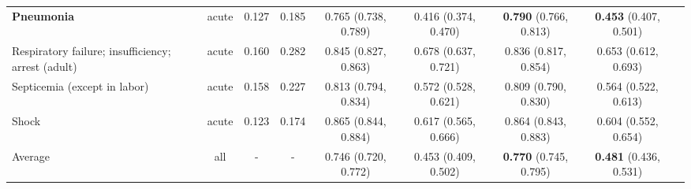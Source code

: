 \documentclass[pmlr]{jmlr}
\begin{document}
\begin{table*}[t!]
{\begin{tabular}{l c c c| c  c| c c c}
    \textbf{Pneumonia} & acute & 0.127 & 0.185 &0.765 (0.738, 0.789) & 0.416 (0.374, 0.470) & \textbf{0.790} (0.766, 0.813) & \textbf{0.453} (0.407, 0.501)\\ 
    Respiratory failure; insufficiency; arrest (adult) & acute & 0.160& 0.282 & 0.845 (0.827, 0.863) & 0.678 (0.637, 0.721) & 0.836 (0.817, 0.854) & 0.653 (0.612, 0.693) \\ 
    Septicemia (except in labor) & acute & 0.158 &0.227 & 0.813 (0.794, 0.834) & 0.572 (0.528, 0.621)&0.809 (0.790, 0.830) & 0.564 (0.522, 0.613)\\ 
    Shock & acute & 0.123 &0.174 & 0.865 (0.844, 0.884) & 0.617 (0.565, 0.666)  & 0.864 (0.843, 0.883) & 0.604 (0.552, 0.654) \\

  \midrule
Average & all & - & - & 0.746 (0.720, 0.772)& 0.453 (0.409, 0.502)  & \textbf{0.770} (0.745, 0.795)  & \textbf{0.481} (0.436, 0.531) \\
  \bottomrule 
    \end{tabular}}
    \label{tab:phenotype_wise}
\end{table*}
\end{document}
